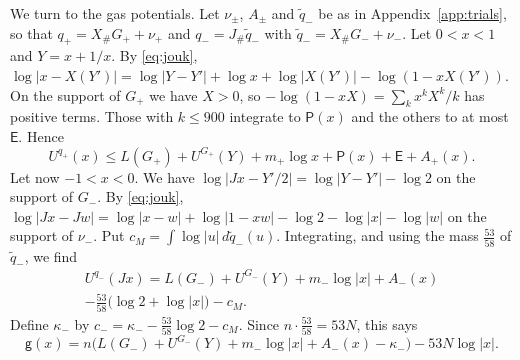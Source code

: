 \documentclass[11pt]{amsart}
\theoremstyle{definition}
\theoremstyle{remark}
\numberwithin{equation}{section}
\begin{document}
We turn to the gas potentials. Let $\nu_\pm$, $A_\pm$ and $\tilde q_-$ be as in Appendix~\ref{app:trials}, so that $q_+=X_\#G_++\nu_+$ and $q_-=J_\#\tilde q_-$ with $\tilde q_-=X_\#G_-+\nu_-$.
Let $0<x<1$ and $Y=x+1/x$. By \eqref{eq:jouk}, $\log|x-X(Y')|=\log|Y-Y'|+\log x+\log|X(Y')|-\log(1-xX(Y'))$. On the support of $G_+$ we have $X>0$, so
$-\log(1-xX)=\sum_kx^kX^k/k$ has positive terms. Those with $k\le900$ integrate to $\mathsf P(x)$ and the others to at most $\mathsf E$. Hence
\begin{equation}\label{eq:qplus}
 U^{q_+}(x)\le L(G_+)+U^{G_+}(Y)+m_+\log x+\mathsf P(x)+\mathsf E+A_+(x).
\end{equation}
Let now $-1<x<0$. We have $\log|Jx-Y'/2|=\log|Y-Y'|-\log2$ on the support of $G_-$. By \eqref{eq:jouk},
$\log|Jx-Jw|=\log|x-w|+\log|1-xw|-\log2-\log|x|-\log|w|$ on the support of $\nu_-$. Put $c_M=\int\log|u|\,d\tilde q_-(u)$. Integrating, and using the mass $\frac{53}{58}$ of $\tilde q_-$, we find
\begin{multline}\label{eq:qminus}
 U^{q_-}(Jx)=L(G_-)+U^{G_-}(Y)+m_-\log|x|+A_-(x)\\
 -\tfrac{53}{58}\bigl(\log2+\log|x|\bigr)-c_M.
\end{multline}
Define $\kappa_-$ by $c_-=\kappa_--\frac{53}{58}\log2-c_M$. Since $n\cdot\frac{53}{58}=53N$, this says
\begin{equation}\label{eq:gneg}
 \mathsf g(x)=n\bigl(L(G_-)+U^{G_-}(Y)+m_-\log|x|+A_-(x)-\kappa_-\bigr)-53N\log|x|.
\end{equation}
\end{document}
